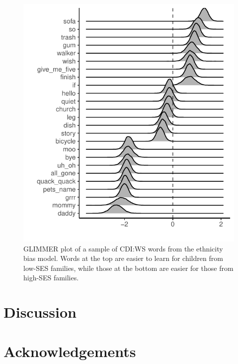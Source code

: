 \documentclass[10pt, letterpaper]{article}
\newenvironment{CodeChunk}{}{}
\begin{document}
\begin{CodeChunk}
\begin{figure}[H]

{\centering \includegraphics[width=\linewidth]{figs/smGLIMMER_eth_prodWS} 

}

\caption[GLIMMER plot of a sample of CDI:WS words from the ethnicity bias model]{GLIMMER plot of a sample of CDI:WS words from the ethnicity bias model. Words at the top are easier to learn for children from low-SES families, while those at the bottom are easier for those from high-SES families.}\label{fig:eth-glimmer}
\end{figure}
\end{CodeChunk}

\hypertarget{discussion}{%
\section{Discussion}\label{discussion}}

\hypertarget{acknowledgements}{%
\section{Acknowledgements}\label{acknowledgements}}
\end{document}
